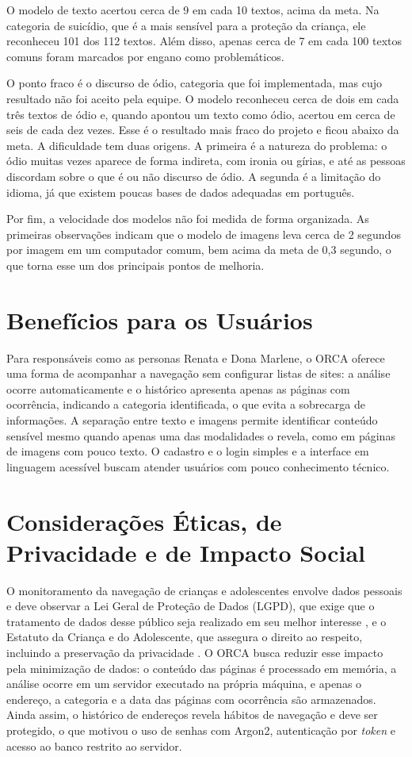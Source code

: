 \documentclass[
    12pt,           %
    oneside,        %
    a4paper,        %
    chapter=TITLE,  %
    english,        %
    brazil          %
]{abntex2}
\begin{document}
O modelo de texto acertou cerca de 9 em cada 10 textos, acima da meta. Na
categoria de suicídio, que é a mais sensível para a proteção da criança, ele
reconheceu 101 dos 112 textos. Além disso, apenas cerca de 7 em cada 100
textos comuns foram marcados por engano como problemáticos.

O ponto fraco é o discurso de ódio, categoria que foi implementada, mas cujo
resultado não foi aceito pela equipe. O modelo reconheceu cerca de dois em
cada três textos de ódio e, quando apontou um texto como ódio, acertou em
cerca de seis de cada dez vezes. Esse é o resultado mais fraco do projeto e
ficou abaixo da meta. A dificuldade tem duas origens. A primeira é a natureza
do problema: o ódio muitas vezes aparece de forma indireta, com ironia ou
gírias, e até as pessoas discordam sobre o que é ou não discurso de ódio. A
segunda é a limitação do idioma, já que existem poucas bases de dados
adequadas em português.

Por fim, a velocidade dos modelos não foi medida de forma organizada. As
primeiras observações indicam que o modelo de imagens leva cerca de 2 segundos
por imagem em um computador comum, bem acima da meta de 0,3 segundo, o que
torna esse um dos principais pontos de melhoria.

\section{Benefícios para os Usuários}

Para responsáveis como as personas Renata e Dona Marlene, o ORCA oferece uma
forma de acompanhar a navegação sem configurar listas de sites: a análise
ocorre automaticamente e o histórico apresenta apenas as páginas com
ocorrência, indicando a categoria identificada, o que evita a sobrecarga de
informações. A separação entre texto e imagens permite identificar conteúdo
sensível mesmo quando apenas uma das modalidades o revela, como em páginas de
imagens com pouco texto. O cadastro e o login simples e a interface em
linguagem acessível buscam atender usuários com pouco conhecimento técnico.

\section{Considerações Éticas, de Privacidade e de Impacto Social}

O monitoramento da navegação de crianças e adolescentes envolve dados
pessoais e deve observar a Lei Geral de Proteção de Dados (LGPD), que exige
que o tratamento de dados desse público seja realizado em seu melhor interesse
\cite{lgpd}, e o Estatuto da Criança e do Adolescente, que assegura o direito
ao respeito, incluindo a preservação da privacidade \cite{eca}. O ORCA busca
reduzir esse impacto pela minimização de dados: o conteúdo das páginas é
processado em memória, a análise ocorre em um servidor executado na própria
máquina, e apenas o endereço, a categoria e a data das páginas com ocorrência
são armazenados. Ainda assim, o histórico de endereços revela hábitos de
navegação e deve ser protegido, o que motivou o uso de senhas com Argon2,
autenticação por \textit{token} e acesso ao banco restrito ao servidor.
\end{document}
